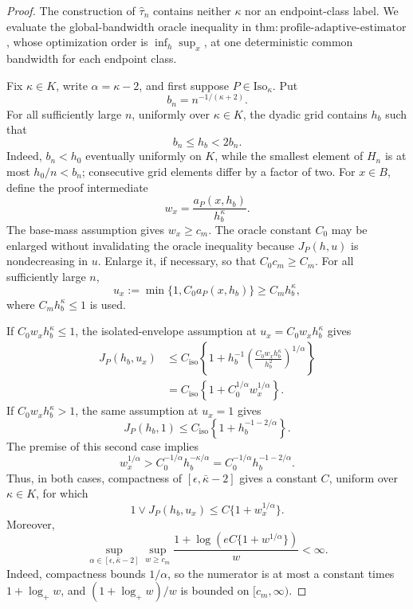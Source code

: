 \documentclass{article}
\begin{document}
\begin{proof}
The construction of \(\widehat\tau_n\) contains neither \(\kappa\) nor an endpoint-class label.  We evaluate the global-bandwidth oracle inequality in
\(\mathrm{thm{:}profile\text{-}adaptive\text{-}estimator}\), whose optimization order is \(\inf_h\sup_x\), at one deterministic common bandwidth for each endpoint class.

Fix \(\kappa\in K\), write \(\alpha=\kappa-2\), and first suppose
\(P\in\mathrm{Iso}_\kappa\).  Put
\[
 b_n=n^{-1/(\kappa+2)}.
\]
For all sufficiently large \(n\), uniformly over \(\kappa\in K\), the dyadic grid contains \(h_b\) such that
\[
 b_n\leq h_b<2b_n.
 \tag{E1}
\]
Indeed, \(b_n<h_0\) eventually uniformly on \(K\), while the smallest element of \(H_n\) is at most \(h_0/n<b_n\); consecutive grid elements differ by a factor of two.  For \(x\in B\), define the proof intermediate
\[
 w_x=\frac{a_P(x,h_b)}{h_b^\kappa}.
\]
The base-mass assumption gives \(w_x\geq c_m\).  The oracle constant \(C_0\) may be enlarged without invalidating the oracle inequality because
\(J_P(h,u)\) is nondecreasing in \(u\).  Enlarge it, if necessary, so that
\(C_0c_m\geq C_m\).  For all sufficiently large \(n\),
\[
 u_x:=\min\{1,C_0a_P(x,h_b)\}
 \geq C_mh_b^\kappa,
 \tag{E2}
\]
where \(C_mh_b^\kappa\leq1\) is used.

If \(C_0w_xh_b^\kappa\leq1\), the isolated-envelope assumption at
\(u_x=C_0w_xh_b^\kappa\) gives
\[
\begin{aligned}
 J_P(h_b,u_x)
 &\leq C_{\mathrm{iso}}\left\{1+h_b^{-1}
 \left(\frac{C_0w_xh_b^\kappa}{h_b^2}\right)^{1/\alpha}\right\}\\
 &=C_{\mathrm{iso}}\left\{1+C_0^{1/\alpha}w_x^{1/\alpha}\right\}.
\end{aligned}
 \tag{E3}
\]
If \(C_0w_xh_b^\kappa>1\), the same assumption at \(u_x=1\) gives
\[
 J_P(h_b,1)
 \leq C_{\mathrm{iso}}\left\{1+h_b^{-1-2/\alpha}\right\}.
 \tag{E4}
\]
The premise of this second case implies
\[
 w_x^{1/\alpha}>C_0^{-1/\alpha}h_b^{-\kappa/\alpha}
 =C_0^{-1/\alpha}h_b^{-1-2/\alpha}.
 \tag{E5}
\]
Thus, in both cases, compactness of
\([\epsilon,\bar\kappa-2]\) gives a constant \(C\), uniform over
\(\kappa\in K\), for which
\[
 1\vee J_P(h_b,u_x)
 \leq C\{1+w_x^{1/\alpha}\}.
 \tag{E6}
\]
Moreover,
\[
 \sup_{\alpha\in[\epsilon,\bar\kappa-2]}
 \sup_{w\geq c_m}
 \frac{1+\log\!\left(eC\{1+w^{1/\alpha}\}\right)}{w}<\infty.
 \tag{E7}
\]
Indeed, compactness bounds \(1/\alpha\), so the numerator is at most a constant times \(1+\log_+w\), and
\((1+\log_+w)/w\) is bounded on \([c_m,\infty)\).


\end{proof}
\end{document}
